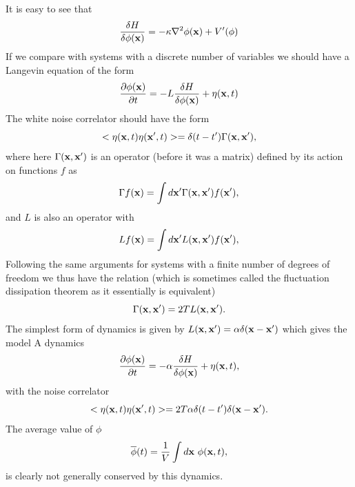 It is easy to see that 
\begin{equation}
    \frac{\delta H}{\delta \phi({\bf x})} = -\kappa \nabla^2 \phi({\bf x}) + V'(\phi)
    \label{cm}
\end{equation}
If we compare with systems with a discrete number of variables we
should have a Langevin equation of the form
\begin{equation}
    \frac{\partial \phi({\bf x})}{\partial t}= -L \frac{\delta H}{\delta \phi({\bf x})} + \eta({\bf x},t)
\end{equation}
The white noise correlator should have the form
\begin{equation}
    < \eta({\bf x},t)\eta({\bf x}',t)> =\delta(t-t')\Gamma({\bf x},{\bf x'}),
\end{equation}
where here  $\Gamma({\bf x},{\bf x'})$ is an operator (before it was a matrix) defined by its action on functions $f$ as
\begin{equation}
    \Gamma f({\bf x}) = \int d{\bf x}' \Gamma({\bf x},{\bf x}')f({\bf x}'),
\end{equation}
and $L$ is also an operator with 
\begin{equation}
    L f({\bf x}) = \int d{\bf x}' L({\bf x},{\bf x}')f({\bf x}'),
\end{equation}
Following the same arguments for systems with a finite number of degrees of freedom we thus have the relation (which is sometimes called the fluctuation dissipation theorem as it essentially is equivalent)
\begin{equation} 
    \Gamma({\bf x},{\bf x}') =2T L({\bf x},{\bf x}').\label{gnoise}
\end{equation}
The simplest form of dynamics is given by $L({\bf x},{\bf x}')=\alpha\delta({\bf x}-{\bf x}')$ which gives the model A dynamics
\begin{equation}
    \frac{\partial \phi({\bf x})}{\partial t}= -\alpha \frac{\delta H}{\delta \phi({\bf x})} + \eta({\bf x},t),    \label{MA}
\end{equation}
with the noise correlator
\begin{equation}
    < \eta({\bf x},t)\eta({\bf x}',t)> =2T \alpha \delta(t-t')\delta({\bf x}-{\bf x'}).
\end{equation}
The average value of $\phi$ 
\begin{equation}
    \overline \phi(t) = \frac{1}{V}\int d{\bf x}\  \phi({\bf x},t),
\end{equation}
is clearly not generally conserved by this dynamics.

